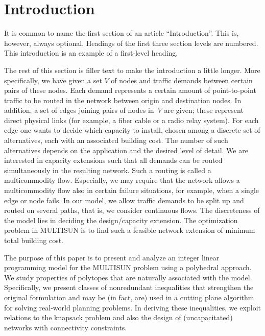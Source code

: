 \documentclass[twocolumn]{svjour3}          %
\begin{document}
\section{Introduction}
\label{se:intro}


It is common to name the first section of an article
``Introduction''. This is, however, always optional. Headings of
the first three section levels are numbered. This introduction is an example of a
first-level heading.

The rest of this section is filler text to make the introduction a
little longer. More specifically, we have given a set $V$ of nodes
and traffic demands between certain pairs of these nodes. Each
demand represents a certain amount of point-to-point traffic to be
routed in the network between origin and destination nodes. In
addition, a set of edges joining pairs of nodes in~$V$ are given;
these represent direct physical links (for example, a fiber cable
or a radio relay system). For each edge one wants to decide which
capacity to install, chosen among a discrete set of alternatives,
each with an associated building cost. The number of such
alternatives depends on the application and the desired level of
detail. We are interested in capacity extensions such that all
demands can be routed simultaneously in the resulting network.
Such a routing is called a multicommodity flow. Especially, we may
require that the network allows a multicommodity flow also in
certain failure situations, for example, when a single edge or
node fails. In our model, we allow traffic demands to be split up
and routed on several paths, that is, we consider continuous
flows. The discreteness of the model lies in deciding the
design/capacity extension. The optimization problem in MULTISUN is
to find such a feasible network extension of minimum total
building cost.

The purpose of this paper is to present and analyze an integer linear
programming model for the MULTISUN problem using a polyhedral
approach. We study properties of polytopes that are naturally
associated with the model. Specifically, we present classes of
nonredundant inequalities that strengthen the original formulation and
may be (in fact, are) used in a cutting plane algorithm for solving
real-world planning problems. In deriving these inequalities, we
exploit relations to the knapsack problem and also the design of
(uncapacitated) networks with connectivity constraints.
\end{document}
